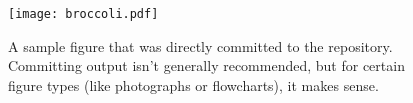 \documentclass[twocolumn]{aastex631}
\begin{document}
\begin{figure}[ht!]
    \begin{centering}
        \texttt{[image: broccoli.pdf]}
        \caption{
            A sample figure that was directly committed to the repository.
            Committing output isn't generally recommended, but for certain figure types (like photographs or flowcharts), it makes sense.
        }
        \label{fig*:broccoli}
    \end{centering}
\end{figure}
\end{document}
